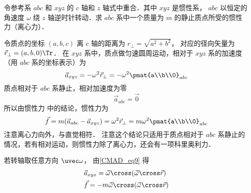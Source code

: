 

令参考系 $abc$ 和 $xyz$ 的 $c$ 轴和 $z$ 轴式中重合．其中 $xyz$ 是惯性系， $abc$ 以恒定的角速度 $\omega$ 绕 $z$ 轴逆时针转动．求 $abc$ 系中一个质量为 $m$ 的静止质点所受的惯性力（离心力）．

令质点的坐标 $(a,b,c)$ 离 $c$ 轴的距离为 $r_\bot = \sqrt{a^2 + b^2}$， 对应的径向矢量为 $\vec r_\bot = (a,b,0)\Tr$． 在 $xyz$ 系中，质点做匀速圆周运动，相对于 $xyz$ 系的加速度（用 $abc$ 系的坐标表示）为
\begin{equation}
\vec a_{xyz} =  - \omega ^2 \vec r_\bot =  - \omega ^2 \pmat{a\\b\\0}_{abc}
\end{equation}
质点相对于 $abc$ 系静止，相对加速度为零
\begin{equation}
\vec a_{abc} = \vec 0
\end{equation}
所以由惯性力 中的结论，惯性力为
\begin{equation}
\vec f = m(\vec a_{abc} - \vec a_{xyz}) = \omega^2\vec r_\bot = m\omega ^2\pmat{a\\b\\0}_{abc}
\end{equation}
注意离心力向外，与直觉相符． 注意这个结论只适用于质点相对于 $abc$ 系静止的情况，若有相对运动，则惯性力除了离心力，还会有一项科里奥利力．

若转轴取任意方向 $\uvec\omega$， 由\autoref{CMAD_eq9} 得
\begin{align}
&\vec a_{xyz} = \vec\omega\cross (\vec\omega\cross\vec r)\\
&\vec f = -m\vec\omega\cross (\vec\omega\cross\vec r)\label{Centri_eq5}
\end{align}